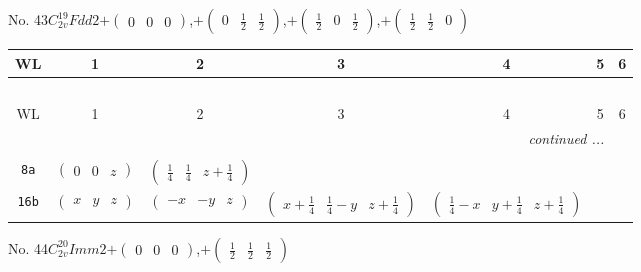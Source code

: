 \documentclass[fleqn,9pt,landscape]{jsarticle}
\begin{document}
\newpage
No. 43\quad$C_{2v}^{19}$\quad$Fdd2$\quad[ orthorhombic ]\quad$+\begin{pmatrix} 0 & 0 & 0 \end{pmatrix}$,\quad $+\begin{pmatrix} 0 & \frac{1}{2} & \frac{1}{2} \end{pmatrix}$,\quad $+\begin{pmatrix} \frac{1}{2} & 0 & \frac{1}{2} \end{pmatrix}$,\quad $+\begin{pmatrix} \frac{1}{2} & \frac{1}{2} & 0 \end{pmatrix}$
\begin{center}
\renewcommand{\arraystretch}{1.2}
\begin{longtable}{ccccccc}
 \hline \hline
WL & 1 & 2 & 3 & 4 & 5 & 6 \\ \hline \endfirsthead

\multicolumn{6}{l}{\tablename\ \thetable{}} \\
 \hline \hline
WL & 1 & 2 & 3 & 4 & 5 & 6 \\ \hline \endhead

 \hline \hline
\multicolumn{6}{r}{\footnotesize\it continued ...} \\ \endfoot

 \hline \hline
\multicolumn{6}{r}{} \\ \endlastfoot

{\tt 8a} & $ \begin{pmatrix} 0 & 0 & z \end{pmatrix} $ & $ \begin{pmatrix} \frac{1}{4} & \frac{1}{4} & z + \frac{1}{4} \end{pmatrix} $ & $  $ & $  $ \\ \hline
{\tt 16b} & $ \begin{pmatrix} x & y & z \end{pmatrix} $ & $ \begin{pmatrix} - x & - y & z \end{pmatrix} $ & $ \begin{pmatrix} x + \frac{1}{4} & \frac{1}{4} - y & z + \frac{1}{4} \end{pmatrix} $ & $ \begin{pmatrix} \frac{1}{4} - x & y + \frac{1}{4} & z + \frac{1}{4} \end{pmatrix} $ \\
\end{longtable}
\end{center}
\newpage
No. 44\quad$C_{2v}^{20}$\quad$Imm2$\quad[ orthorhombic ]\quad$+\begin{pmatrix} 0 & 0 & 0 \end{pmatrix}$,\quad $+\begin{pmatrix} \frac{1}{2} & \frac{1}{2} & \frac{1}{2} \end{pmatrix}$
\end{document}
